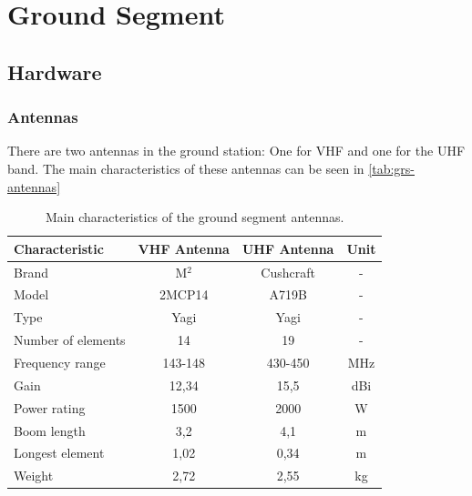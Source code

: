 %
%
%
%
%

%
%
%
%
%
%

\chapter{Ground Segment} \label{ch:ground-segment}

\section{Hardware}

\subsection{Antennas}

There are two antennas in the ground station: One for VHF and one for the UHF band. The main characteristics of these antennas can be seen in \autoref{tab:grs-antennas}

\begin{table}[ht]
    \centering
    \begin{tabular}{lccc}
        \toprule[1.5pt]
        \textbf{Characteristic} & \textbf{VHF Antenna}  & \textbf{UHF Antenna}  & \textbf{Unit} \\
        \midrule
        Brand                   & M$^{2}$               & Cushcraft             & - \\
        Model                   & 2MCP14                & A719B                 & - \\
        Type                    & Yagi                  & Yagi                  & - \\
        Number of elements      & 14                    & 19                    & - \\
        Frequency range         & 143-148               & 430-450               & MHz \\
        Gain                    & 12,34                 & 15,5                  & dBi \\
        Power rating            & 1500                  & 2000                  & W \\
        Boom length             & 3,2                   & 4,1                   & m \\
        Longest element         & 1,02                  & 0,34                  & m \\
        Weight                  & 2,72                  & 2,55                  & kg \\
        \bottomrule[1.5pt]
    \end{tabular}
    \caption{Main characteristics of the ground segment antennas.}
    \label{tab:grs-antennas}
\end{table}

